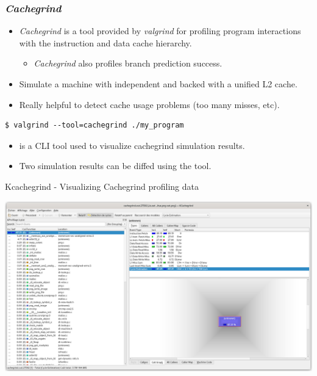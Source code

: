 \begin{frame}[fragile]
  \frametitle{{\em Cachegrind}}
  \begin{itemize}
    \item {\em Cachegrind} is a tool provided by {\em valgrind} for
      profiling program interactions with the instruction and data cache hierarchy.
    \begin{itemize}
      \item {\em Cachegrind} also profiles branch prediction success.
    \end{itemize}
    \item Simulate a machine with independent  and  backed
          with a unified L2 cache.
    \item Really helpful to detect cache usage problems (too many misses, etc).
  \end{itemize}
  \begin{block}{}
    \begin{verbatim}
$ valgrind --tool=cachegrind ./my_program
    \end{verbatim}
  \end{block}
  \begin{itemize}
    \item {} is a CLI tool used to visualize cachegrind
          simulation results.
    \item Two simulation results can be diffed using the  tool.
  \end{itemize}
\end{frame}

\begin{frame}{Kcachegrind - Visualizing Cachegrind profiling data}
  \begin{center}
    \includegraphics[height=0.8\textheight]{slides/debugging-application-profiling/kcachegrind_cachegrind.png}
  \end{center}
\end{frame}


